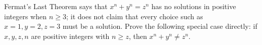 Fermat's Last Theorem says that \(x^n+y^n=z^n\) has no solutions in positive integers when \(n\ge 3\); it does not claim that every choice such as \(x=1,y=2,z=3\) must be a solution. Prove the following special case directly: if \(x,y,z,n\) are positive integers with \(n\ge z\), then \(x^n+y^n\ne z^n\).
